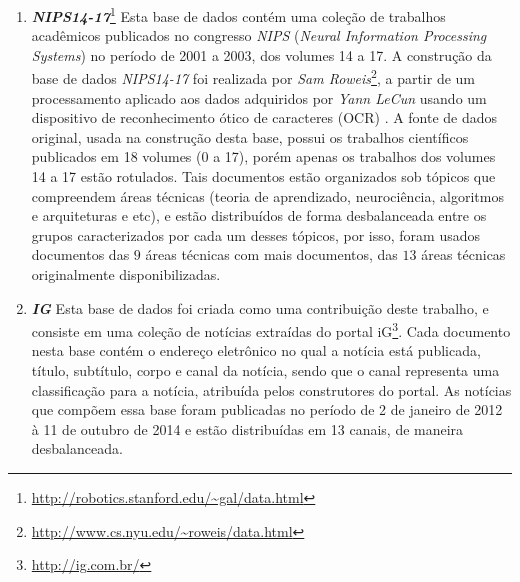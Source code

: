 \documentclass[
    12pt,                %
    oneside,            %
    a4paper,            %
    english,            %
    brazil                %
    ]{abntex2ppgsi}
\begin{document}
\begin{enumerate}

    \item \textbf{\textit{NIPS14-17}}\footnote{\url{http://robotics.stanford.edu/~gal/data.html}} Esta base de dados contém uma coleção de trabalhos acadêmicos publicados no congresso \textit{NIPS} (\textit{Neural Information Processing Systems}) no período de 2001 a 2003, dos volumes 14 a 17.
    A construção da base de dados \textit{NIPS14-17} foi realizada por \textit{Sam Roweis}\footnote{\url{http://www.cs.nyu.edu/~roweis/data.html}}, a partir de um processamento aplicado aos dados adquiridos por \textit{Yann LeCun} usando um dispositivo de reconhecimento ótico de caracteres (OCR) \cite{Chechik2007}. A fonte de dados original, usada na construção desta base, possui os trabalhos científicos publicados em 18 volumes (0 a 17), porém apenas os trabalhos dos volumes 14 a 17 estão rotulados. Tais documentos estão organizados sob tópicos que compreendem áreas técnicas (teoria de aprendizado, neurociência, algoritmos e arquiteturas e etc), e estão distribuídos de forma desbalanceada entre os grupos caracterizados por cada um desses tópicos, por isso, foram usados documentos das $9$ áreas técnicas com mais documentos, das $13$ áreas técnicas originalmente disponibilizadas.

    \item \textbf{\textit{IG}} Esta base de dados foi criada como uma contribuição deste trabalho, e consiste em uma coleção de notícias extraídas do portal iG\footnote{\url{http://ig.com.br/}}.
    Cada documento nesta base contém o endereço eletrônico no qual a notícia está publicada, título, subtítulo, corpo e canal da notícia, sendo que o canal representa uma classificação para a notícia, atribuída pelos construtores do portal. As notícias que compõem essa base foram publicadas no período de 2 de janeiro de 2012 à 11 de outubro de 2014 e estão distribuídas em 13 canais, de maneira desbalanceada.


\end{enumerate}
\end{document}
